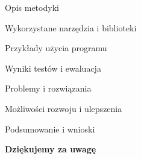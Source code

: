 \documentclass[aspectratio=169,xcolor=dvipsnames]{beamer}
\begin{document}

\begin{frame}{Opis metodyki}
\end{frame}


\begin{frame}{Wykorzystane narzędzia i biblioteki}

\end{frame}


\begin{frame}{Przykłady użycia programu}

\end{frame}


\begin{frame}{Wyniki testów i ewaluacja}
    
\end{frame}


\begin{frame}{Problemy i rozwiązania}

\end{frame}


\begin{frame}{Możliwości rozwoju i ulepszenia}
    
\end{frame}


\begin{frame}{Podsumowanie i wnioski}

\end{frame}


\begin{frame}
    \Huge{\centerline{\textbf{Dziękujemy za uwagę}}}
\end{frame}

\end{document}
